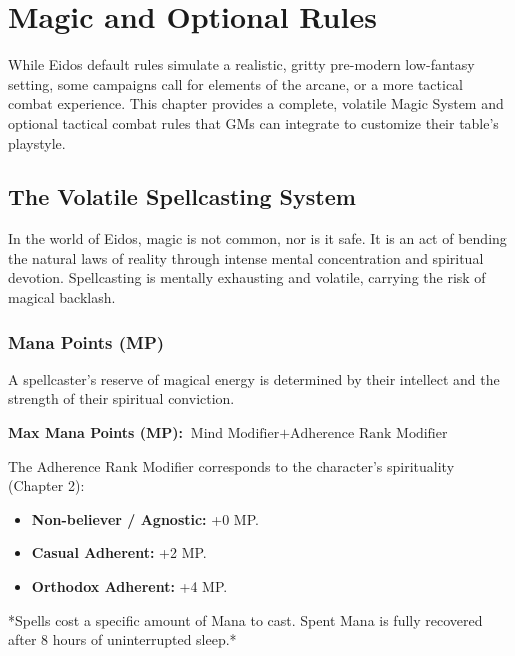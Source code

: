 \chapter{Magic and Optional Rules}

While Eidos default rules simulate a realistic, gritty pre-modern low-fantasy setting, some campaigns call for elements of the arcane, or a more tactical combat experience. This chapter provides a complete, volatile Magic System and optional tactical combat rules that GMs can integrate to customize their table's playstyle.

\section{The Volatile Spellcasting System}

In the world of Eidos, magic is not common, nor is it safe. It is an act of bending the natural laws of reality through intense mental concentration and spiritual devotion. Spellcasting is mentally exhausting and volatile, carrying the risk of magical backlash.

\subsection{Mana Points (MP)}
A spellcaster’s reserve of magical energy is determined by their intellect and the strength of their spiritual conviction. 
\begin{center}
    \textbf{Max Mana Points (MP):} $\text{Mind Modifier} + \text{Adherence Rank Modifier}$
\end{center}

The Adherence Rank Modifier corresponds to the character's spirituality (Chapter 2):
\begin{itemize}
    \item \textbf{Non-believer / Agnostic:} +0 MP.
    \item \textbf{Casual Adherent:} +2 MP.
    \item \textbf{Orthodox Adherent:} +4 MP.
\end{itemize}

*Spells cost a specific amount of Mana to cast. Spent Mana is fully recovered after 8 hours of uninterrupted sleep.*


